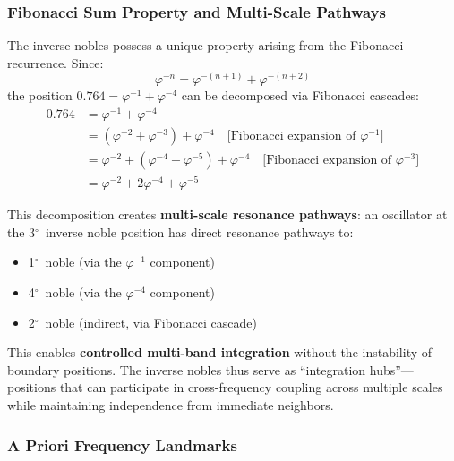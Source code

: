 \documentclass[11pt,a4paper]{article}
\newcommand{\degree}{$^\circ$}  %
\newcommand{\phisym}{\varphi}
\begin{document}
\subsubsection{Fibonacci Sum Property and Multi-Scale Pathways}
\label{sec:fibonacci_pathways}

The inverse nobles possess a unique property arising from the Fibonacci recurrence. Since:
\begin{equation}
\phisym^{-n} = \phisym^{-(n+1)} + \phisym^{-(n+2)}
\end{equation}
the position $0.764 = \phisym^{-1} + \phisym^{-4}$ can be decomposed via Fibonacci cascades:
\begin{align}
0.764 &= \phisym^{-1} + \phisym^{-4} \\
      &= (\phisym^{-2} + \phisym^{-3}) + \phisym^{-4} \quad \text{[Fibonacci expansion of $\phisym^{-1}$]} \\
      &= \phisym^{-2} + (\phisym^{-4} + \phisym^{-5}) + \phisym^{-4} \quad \text{[Fibonacci expansion of $\phisym^{-3}$]} \\
      &= \phisym^{-2} + 2\phisym^{-4} + \phisym^{-5}
\end{align}

This decomposition creates \textbf{multi-scale resonance pathways}: an oscillator at the 3\degree\ inverse noble position has direct resonance pathways to:
\begin{itemize}
    \item 1\degree\ noble (via the $\phisym^{-1}$ component)
    \item 4\degree\ noble (via the $\phisym^{-4}$ component)
    \item 2\degree\ noble (indirect, via Fibonacci cascade)
\end{itemize}

This enables \textbf{controlled multi-band integration} without the instability of boundary positions. The inverse nobles thus serve as ``integration hubs''---positions that can participate in cross-frequency coupling across multiple scales while maintaining independence from immediate neighbors.

\subsubsection{A Priori Frequency Landmarks}
\end{document}
